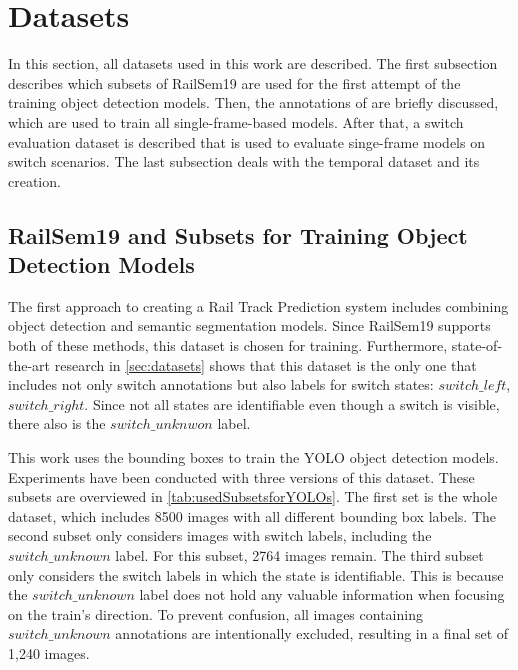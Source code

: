 \section{Datasets}
\label{sec:usedDatasets}

In this section, all datasets used in this work are described.
The first subsection describes which subsets of RailSem19 are used for the first attempt of the training object detection models.
Then, the annotations of \cite{tepNet2024} are briefly discussed, which are used to train all single-frame-based models.
After that, a switch evaluation dataset is described that is used to evaluate singe-frame models on switch scenarios.
The last subsection deals with the temporal dataset and its creation.


\subsection{RailSem19 and Subsets for Training Object Detection Models}
\label{sec:usedDatasetsYOLOs}

The first approach to creating a Rail Track Prediction system includes combining object detection and semantic segmentation models.
Since RailSem19 supports both of these methods, this dataset is chosen for training.
Furthermore, state-of-the-art research in \autoref{sec:datasets} shows that this dataset is the only one that includes not only switch annotations but also labels for switch states: $switch\_left$, $switch\_right$.
Since not all states are identifiable even though a switch is visible, there also is the $switch\_unknwon$ label.

This work uses the bounding boxes to train the \ac{YOLO} object detection models.
Experiments have been conducted with three versions of this dataset.
These subsets are overviewed in \autoref{tab:usedSubsetsforYOLOs}.
The first set is the whole dataset, which includes 8500 images with all different bounding box labels.
The second subset only considers images with switch labels, including the $switch\_unknown$ label.
For this subset, 2764 images remain. The third subset only considers the switch labels in which the state is identifiable.
This is because the $switch\_unknown$ label does not hold any valuable information when focusing on the train's direction.
To prevent confusion, all images containing $switch\_unknown$ annotations are intentionally excluded, resulting in a final set of 1,240 images.

